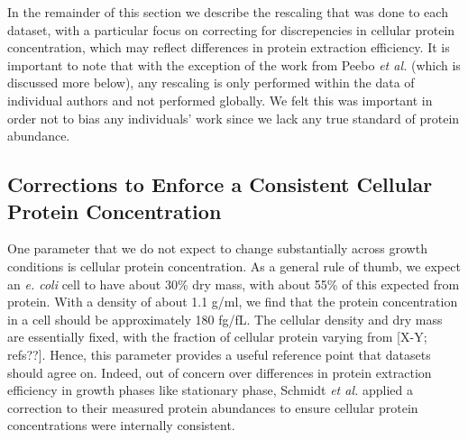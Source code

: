 \documentclass[11pt]{article}
\begin{document}
In the remainder of this section we describe the rescaling that was done to each
dataset, with a particular focus on correcting for discrepencies in cellular
protein concentration, which may reflect differences in protein extraction
efficiency. It is important to note that with the exception of the work from
Peebo {\it et al.} (which is discussed more below), any rescaling is only
performed within the data of individual authors and not performed globally. We
felt this was important in order not to bias any individuals' work since we lack
any true standard of protein abundance.



\subsection{Corrections to Enforce a Consistent Cellular Protein Concentration}


One parameter that we do not expect to change substantially across growth
conditions is cellular protein concentration. As a general rule of thumb, we
expect an {\it e. coli} cell to have about 30\% dry mass, with about 55\% of
this expected from protein. With a density of about 1.1 g/ml, we find that the
protein concentration in a cell should be approximately 180 fg/fL.  The cellular
density and dry mass are essentially fixed, with the fraction of cellular
protein varying from [X-Y; refs??]. Hence,  this parameter provides a useful
reference point that datasets should agree on.  Indeed, out of concern over
differences in protein extraction efficiency in growth phases like stationary
phase, Schmidt {\it et al.} applied a correction to their measured protein
abundances to ensure cellular protein concentrations were internally consistent.
\end{document}
